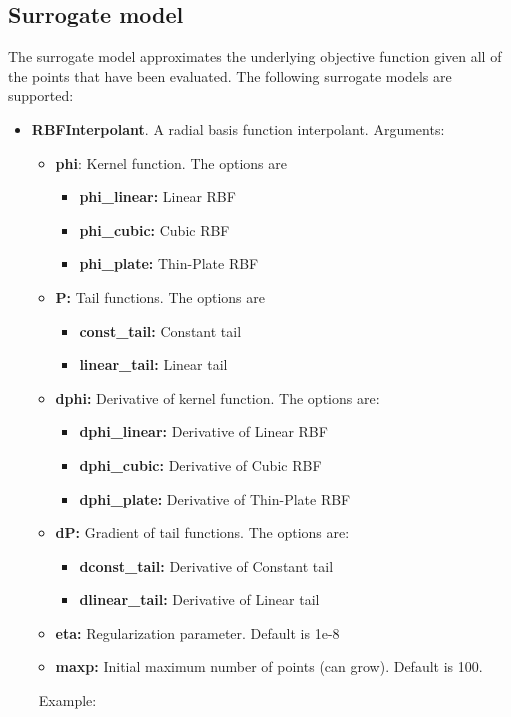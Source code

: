 \documentclass[]{article}
\begin{document}
\subsection{Surrogate model} The surrogate model approximates the underlying objective function given all of the points that have been evaluated. The following surrogate models are supported:
\begin{itemize}
\item \textbf{RBFInterpolant}. A radial basis function interpolant. Arguments:
\begin{itemize}
\item \textbf{phi}: Kernel function. The options are 
\begin{itemize}
\item \textbf{phi\_linear:} Linear RBF
\item \textbf{phi\_cubic:} Cubic RBF
\item \textbf{phi\_plate:} Thin-Plate RBF
\end{itemize}
\item \textbf{P:} Tail functions. The options are
\begin{itemize}
\item \textbf{const\_tail:} Constant tail
\item \textbf{linear\_tail:} Linear tail
\end{itemize}
\item \textbf{dphi:} Derivative of kernel function. The options are:
\begin{itemize}
\item \textbf{dphi\_linear:} Derivative of Linear RBF
\item \textbf{dphi\_cubic:} Derivative of Cubic RBF
\item \textbf{dphi\_plate:} Derivative of Thin-Plate RBF
\end{itemize}
\item \textbf{dP:} Gradient of tail functions. The options are:
\begin{itemize}
\item \textbf{dconst\_tail:} Derivative of Constant tail
\item \textbf{dlinear\_tail:} Derivative of Linear tail
\end{itemize}
\item \textbf{eta:} Regularization parameter. Default is 1e-8
\item \textbf{maxp:} Initial maximum number of points (can grow). Default is 100.
\end{itemize}
\ \newline Example:

\end{itemize}
\end{document}
